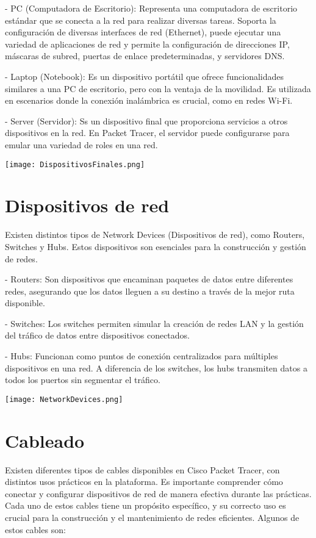 \documentclass{article}
\begin{document}
- PC (Computadora de Escritorio): Representa una computadora de escritorio estándar que se conecta a la red para realizar diversas tareas. Soporta la configuración de diversas interfaces de red (Ethernet), puede ejecutar una variedad de aplicaciones de red y permite la configuración de direcciones IP, máscaras de subred, puertas de enlace predeterminadas, y servidores DNS.

- Laptop (Notebook): Es un dispositivo portátil que ofrece funcionalidades similares a una PC de escritorio, pero con la ventaja de la movilidad. Es utilizada en escenarios donde la conexión inalámbrica es crucial, como en redes Wi-Fi.

- Server (Servidor): Ss un dispositivo final que proporciona servicios a otros dispositivos en la red. En Packet Tracer, el servidor puede configurarse para emular una variedad de roles en una red.

\begin{center}
    \texttt{[image: DispositivosFinales.png]}
\end{center}

\section{Dispositivos de red}
Existen distintos tipos de Network Devices (Dispositivos de red), como Routers, Switches y Hubs. Estos dispositivos son esenciales para la construcción y gestión de redes. 

- Routers: Son dispositivos que encaminan paquetes de datos entre diferentes redes, asegurando que los datos lleguen a su destino a través de la mejor ruta disponible.

- Switches: Los switches permiten simular la creación de redes LAN y la gestión del tráfico de datos entre dispositivos conectados.

- Hubs: Funcionan como puntos de conexión centralizados para múltiples dispositivos en una red. A diferencia de los switches, los hubs transmiten datos a todos los puertos sin segmentar el tráfico.

\begin{center}
    \texttt{[image: NetworkDevices.png]}
\end{center}

\section{Cableado}
Existen diferentes tipos de cables disponibles en Cisco Packet Tracer, con distintos usos prácticos en la plataforma. Es importante comprender cómo conectar y configurar dispositivos de red de manera efectiva durante las prácticas. Cada uno de estos cables tiene un propósito específico, y su correcto uso es crucial para la construcción y el mantenimiento de redes eficientes. Algunos de estos cables son:
\end{document}
